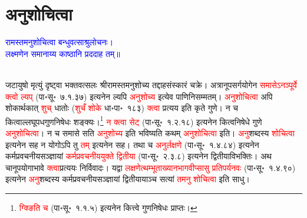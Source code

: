 \section[अनुशोचित्वा]{अनुशोचित्वा}
\centering\textcolor{blue}{रामस्तमनुशोचित्वा बन्धुवत्साश्रुलोचनः।\nopagebreak\\
लक्ष्मणेन समानाय्य काष्ठानि प्रददाह तम्॥}\nopagebreak\\
\\
\begin{sloppypar}\justifying\noindent\hspace{10mm} जटायुषो मृत्युं दृष्ट्वा भक्त\-वत्सलः श्रीरामस्तमनुशोच्य तद्दाह\-संस्कारं चक्रे। अत्रानूपसर्ग\-योगेन \textcolor{red}{समासेऽनञ्पूर्वे क्त्वो ल्यप्} (पा॰सू॰~७.१.३७) इत्यनेन ल्यपि \textcolor{red}{अनुशोच्य} इत्येव पाणिनि\-सम्मतम्। \textcolor{red}{अनुशोचित्वा} अपि शोकार्थकात् \textcolor{red}{शुच्} धातोः (\textcolor{red}{शुचँ शोके} धा॰पा॰~१८३)
\textcolor{red}{क्त्वा} प्रत्यय इति कृते गुणे। न च कित्वाल्लघूपध\-गुण\-निषेधः शङ्क्यः।\footnote{\textcolor{red}{ग्क्ङिति च} (पा॰सू॰~१.१.५) इत्यनेन कित्त्वे गुणनिषेधः प्राप्तः।} \textcolor{red}{न क्त्वा सेट्} (पा॰सू॰~१.२.१८) इत्यनेन कित्व\-निषेधे गुणे \textcolor{red}{अनुशोचित्वा}। न च समासे सति \textcolor{red}{अनुशोच्य} इति भविष्यति कथम् \textcolor{red}{अनुशोचित्वा} इति। \textcolor{red}{अनु}\-शब्दस्य \textcolor{red}{शोचित्वा} इत्यनेन सह न योगोऽपि तु \textcolor{red}{तम्} इत्यनेन सह। तथा च \textcolor{red}{अनुर्लक्षणे} (पा॰सू॰~१.४.८४) इत्यनेन कर्म\-प्रवचनीय\-सञ्ज्ञायां \textcolor{red}{कर्म\-प्रवचनीय\-युक्ते द्वितीया} (पा॰सू॰~२.३.८) इत्यनेन द्वितीया\-विभक्तिः। अथ चानूपयोगाभावे \textcolor{red}{क्त्वा}\-प्रत्ययः निर्विवादः। यद्वा \textcolor{red}{लक्षणेत्थम्भूताख्यान\-भाग\-वीप्सासु प्रतिपर्यनवः} (पा॰सू॰~१.४.९०) इत्यनेन \textcolor{red}{अनु}\-शब्दस्य कर्म\-प्रवचनीय\-सञ्ज्ञायां द्वितीयायाञ्च सत्यां \textcolor{red}{तमनु शोचित्वा} इति साधु।\end{sloppypar}
